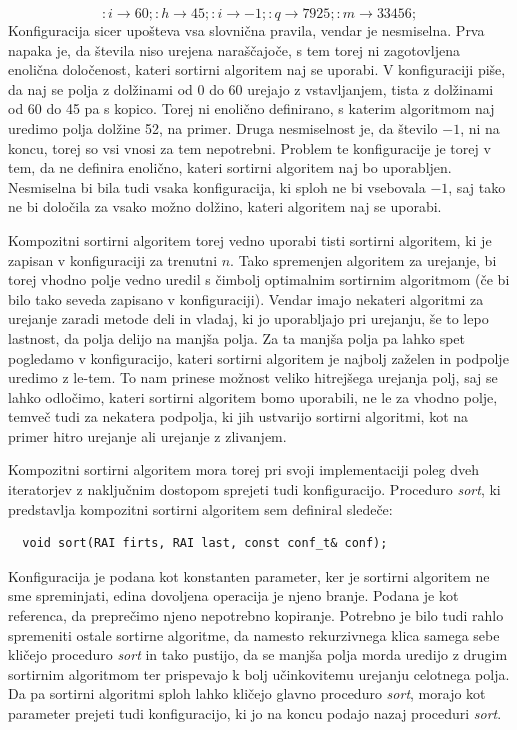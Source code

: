 \documentclass[a4paper,oneside]{article}
\newcommand{\lra}{\ensuremath{\longrightarrow}}
\begin{document}
\[ :i \lra 60;:h \lra 45;:i \lra -1;:q \lra 7925;:m \lra 33456; \]
Konfiguracija sicer upošteva vsa slovnična pravila, vendar je nesmiselna. Prva napaka je,
da števila niso urejena naraščajoče, s tem torej ni zagotovljena enolična določenost,
kateri sortirni algoritem naj se uporabi. V konfiguraciji piše, da naj se polja z
dolžinami od 0 do 60 urejajo z vstavljanjem, tista z dolžinami od 60 do 45 pa s kopico.
Torej ni enolično definirano, s katerim algoritmom naj uredimo polja dolžine 52, na primer. 
Druga nesmiselnost je, da število $-1$, ni na koncu, torej so
vsi vnosi za tem nepotrebni. Problem te konfiguracije je torej v tem, da ne definira
enolično, kateri sortirni algoritem naj bo uporabljen. Nesmiselna bi bila tudi vsaka
konfiguracija, ki sploh ne bi vsebovala $-1$, saj tako ne bi določila za vsako možno
dolžino, kateri algoritem naj se uporabi.

Kompozitni sortirni algoritem torej vedno uporabi tisti sortirni algoritem, ki je zapisan
v konfiguraciji za trenutni $n$. Tako spremenjen algoritem za urejanje, bi torej vhodno
polje vedno uredil s čimbolj optimalnim sortirnim algoritmom (če bi bilo tako seveda
zapisano v konfiguraciji). Vendar imajo nekateri algoritmi za urejanje zaradi metode deli in vladaj,
ki jo uporabljajo pri urejanju, še to lepo lastnost, da polja delijo na manjša polja. Za
ta manjša polja pa lahko spet pogledamo v konfiguracijo, kateri sortirni algoritem je
najbolj zaželen in podpolje uredimo z le-tem. To nam prinese možnost veliko hitrejšega
urejanja polj, saj se lahko odločimo, kateri sortirni algoritem bomo
uporabili, ne le za vhodno polje, temveč tudi za nekatera podpolja, ki jih ustvarijo
sortirni algoritmi, kot na primer hitro urejanje ali urejanje z zlivanjem.

Kompozitni sortirni algoritem mora torej pri svoji implementaciji poleg dveh 
iteratorjev z naključnim dostopom sprejeti tudi konfiguracijo. Proceduro \emph{sort},
ki predstavlja kompozitni sortirni algoritem sem definiral sledeče: 

\begin{lstlisting}
  void sort(RAI firts, RAI last, const conf_t& conf);
\end{lstlisting}

Konfiguracija je podana kot konstanten parameter, ker je sortirni algoritem ne sme
spreminjati, edina dovoljena operacija je njeno branje. Podana je kot referenca, da
preprečimo njeno nepotrebno kopiranje.
Potrebno je bilo tudi rahlo spremeniti ostale sortirne algoritme, da namesto rekurzivnega
klica samega sebe kličejo proceduro \emph{sort} in tako pustijo, da se manjša polja morda uredijo z
drugim sortirnim algoritmom ter prispevajo k bolj učinkovitemu urejanju celotnega polja. Da pa
sortirni algoritmi sploh lahko kličejo glavno proceduro \emph{sort}, morajo kot
parameter prejeti tudi konfiguracijo, ki jo na koncu podajo nazaj proceduri \emph{sort}.
\end{document}
